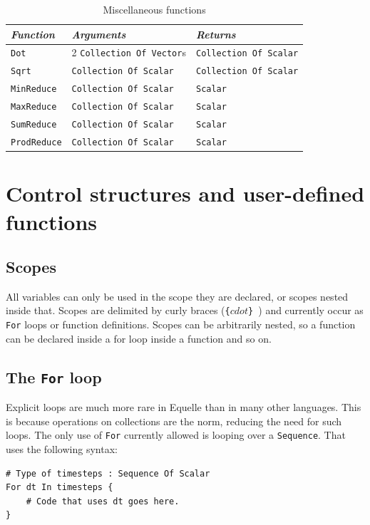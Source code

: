 \documentclass[11pt]{article}
\newcommand{\code}[1]{\texttt{#1}}
\begin{document}
\begin{table}
\begin{tabular}{l|l|l}
{\em Function} & {\em Arguments} & {\em Returns} \\
\hline
\code{Dot} & 2 \code{Collection Of Vector}s & \code{Collection Of Scalar} \\
\code{Sqrt} & \code{Collection Of Scalar} & \code{Collection Of Scalar} \\
\code{MinReduce} & \code{Collection Of Scalar} & \code{Scalar} \\
\code{MaxReduce} & \code{Collection Of Scalar} & \code{Scalar} \\
\code{SumReduce} & \code{Collection Of Scalar} & \code{Scalar} \\
\code{ProdReduce} & \code{Collection Of Scalar} & \code{Scalar} \\
\end{tabular}
\caption{Miscellaneous functions}
\label{tab:miscfunc}
\end{table}

\section{Control structures and user-defined functions}

\subsection{Scopes}

All variables can only be used in the scope they are declared, or scopes nested inside
that. Scopes are delimited by curly braces (\code{\{$cdot$\} }) and currently occur as
\code{For} loops or function definitions. Scopes can be arbitrarily nested, so a function
can be declared inside a for loop inside a function and so on.

\subsection{The \code{For} loop}

Explicit loops are much more rare in Equelle than in many other languages. This is because
operations on collections are the norm, reducing the need for such loops. The only use of
\code{For} currently allowed is looping over a \code{Sequence}. That uses the following
syntax:

\begin{verbatim}
# Type of timesteps : Sequence Of Scalar
For dt In timesteps {
    # Code that uses dt goes here.
}
\end{verbatim}
\end{document}
